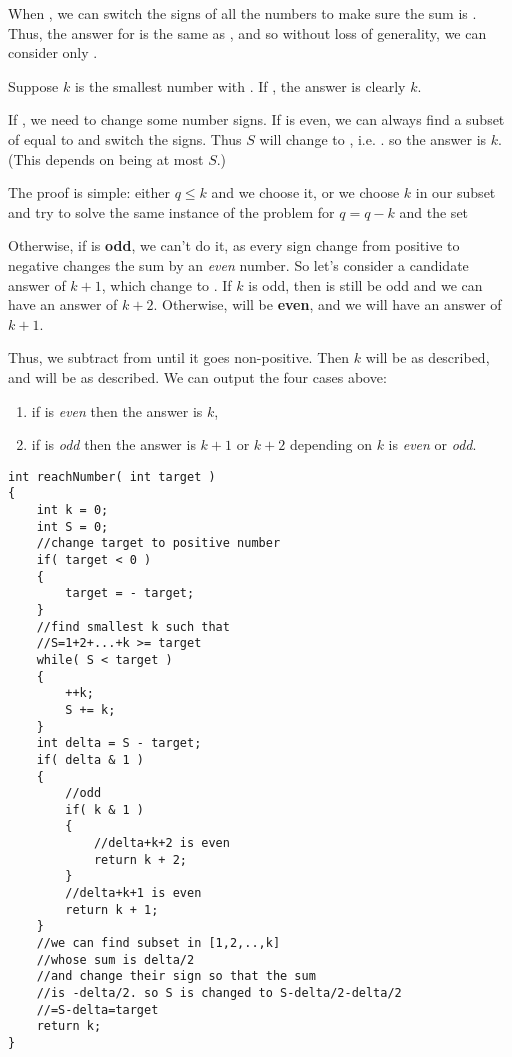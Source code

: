 When , we can switch the signs of all the numbers to make sure the sum is . Thus, the answer for  is the same as , and so without loss of generality, we can consider only .

Suppose $k$ is the smallest number with . If , the answer is clearly $k$.

If , we need to change some number signs. If  is even, we can always find a subset of \fcj{[1, 2, ..., k]} equal to  and switch the signs. Thus $S$ will change to , i.e. . so the answer is $k$. (This depends on  being at most $S$.) 

The proof is simple: either $q \leq k$ and we choose it, or we choose $k$ in our subset and try to solve the same instance of the problem for $q = q - k$ and the set \fcj{[1, 2, ..., k-1]}

Otherwise, if  is \textbf{odd}, we can't do it, as every sign change from positive to negative changes the sum by an \textit{even} number. So let's consider a candidate answer of $k+1$, which change  to . If $k$ is odd, then  is still be odd and we can have an answer of $k+2$. Otherwise,  will be \textbf{even}, and we will have an answer of $k+1$.

Thus, we subtract  from  until it goes non-positive. Then $k$ will be as described, and  will be  as described. We can output the four cases above: 

\begin{enumerate}
\item if  is \textit{even} then the answer is $k$, 

\item if  is \textit{odd} then the answer is $k+1$ or $k+2$ depending on $k$ is \textit{even} or \textit{odd}.
\end{enumerate}

\setcounter{lstlisting}{0}
\begin{lstlisting}[style=customc, caption={Mathematical}]
int reachNumber( int target )
{
    int k = 0;
    int S = 0;
    //change target to positive number
    if( target < 0 )
    {
        target = - target;
    }
    //find smallest k such that
    //S=1+2+...+k >= target
    while( S < target )
    {
        ++k;
        S += k;
    }
    int delta = S - target;
    if( delta & 1 )
    {
        //odd
        if( k & 1 )
        {
            //delta+k+2 is even
            return k + 2;
        }
        //delta+k+1 is even
        return k + 1;
    }
    //we can find subset in [1,2,..,k]
    //whose sum is delta/2
    //and change their sign so that the sum
    //is -delta/2. so S is changed to S-delta/2-delta/2
    //=S-delta=target
    return k;
}
\end{lstlisting}